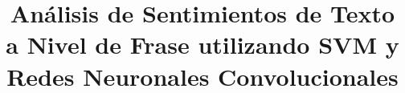 \documentclass[conference]{IEEEtran}
\begin{document}
	


\title{
	Análisis de Sentimientos de Texto a Nivel de Frase utilizando SVM y Redes Neuronales Convolucionales
}

\author{
}

\maketitle




\begin{abstract}

	

\end{abstract}




\begin{IEEEkeywords}
	
	
    	
\end{IEEEkeywords}



\end{document}
